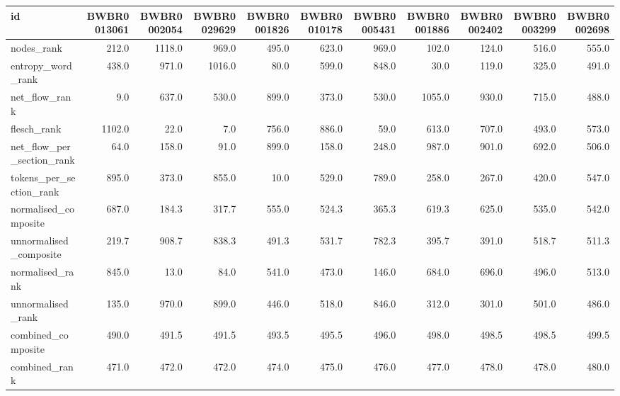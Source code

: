 \begin{tabular}{lrrrrrrrrrr}
\toprule
id & BWBR0013061 & BWBR0002054 & BWBR0029629 & BWBR0001826 & BWBR0010178 & BWBR0005431 & BWBR0001886 & BWBR0002402 & BWBR0003299 & BWBR0002698 \\
\midrule
nodes\_rank & 212.0 & 1118.0 & 969.0 & 495.0 & 623.0 & 969.0 & 102.0 & 124.0 & 516.0 & 555.0 \\
\cline{1-11}
entropy\_word\_rank & 438.0 & 971.0 & 1016.0 & 80.0 & 599.0 & 848.0 & 30.0 & 119.0 & 325.0 & 491.0 \\
\cline{1-11}
net\_flow\_rank & 9.0 & 637.0 & 530.0 & 899.0 & 373.0 & 530.0 & 1055.0 & 930.0 & 715.0 & 488.0 \\
\cline{1-11}
flesch\_rank & 1102.0 & 22.0 & 7.0 & 756.0 & 886.0 & 59.0 & 613.0 & 707.0 & 493.0 & 573.0 \\
\cline{1-11}
net\_flow\_per\_section\_rank & 64.0 & 158.0 & 91.0 & 899.0 & 158.0 & 248.0 & 987.0 & 901.0 & 692.0 & 506.0 \\
\cline{1-11}
tokens\_per\_section\_rank & 895.0 & 373.0 & 855.0 & 10.0 & 529.0 & 789.0 & 258.0 & 267.0 & 420.0 & 547.0 \\
\cline{1-11}
normalised\_composite & 687.0 & 184.3 & 317.7 & 555.0 & 524.3 & 365.3 & 619.3 & 625.0 & 535.0 & 542.0 \\
\cline{1-11}
unnormalised\_composite & 219.7 & 908.7 & 838.3 & 491.3 & 531.7 & 782.3 & 395.7 & 391.0 & 518.7 & 511.3 \\
\cline{1-11}
normalised\_rank & 845.0 & 13.0 & 84.0 & 541.0 & 473.0 & 146.0 & 684.0 & 696.0 & 496.0 & 513.0 \\
\cline{1-11}
unnormalised\_rank & 135.0 & 970.0 & 899.0 & 446.0 & 518.0 & 846.0 & 312.0 & 301.0 & 501.0 & 486.0 \\
\cline{1-11}
combined\_composite & 490.0 & 491.5 & 491.5 & 493.5 & 495.5 & 496.0 & 498.0 & 498.5 & 498.5 & 499.5 \\
\cline{1-11}
combined\_rank & 471.0 & 472.0 & 472.0 & 474.0 & 475.0 & 476.0 & 477.0 & 478.0 & 478.0 & 480.0 \\
\cline{1-11}
\bottomrule
\end{tabular}

